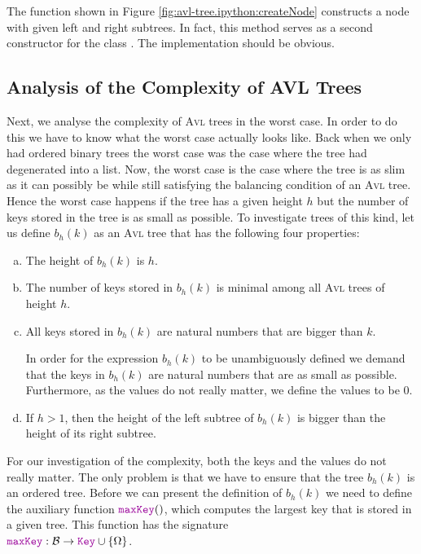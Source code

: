 The function  shown in Figure \ref{fig:avl-tree.ipython:createNode}
constructs a node with given left and right subtrees.  In fact, this method serves as a second
constructor for the class .  The implementation should be obvious.


\subsection{Analysis of the Complexity of AVL Trees}
Next, we analyse the complexity of \textsc{Avl} trees in the worst case.  In order to do this we have to know
what the worst case actually looks like.  Back when we only had ordered binary trees the worst case was the case where
the tree had degenerated into a list.  Now, the worst case is the case where the tree is as slim as
it can possibly be while still satisfying the balancing condition of an \textsc{Avl} tree.  Hence the worst case
happens if the tree has a given height $h$ but the number of keys stored in the tree is as small as
possible.  To investigate trees of this kind, let us define  $b_h(k)$ as an \textsc{Avl} tree that has the following four
properties:
\begin{enumerate}[(a)]
\item The height of $b_h(k)$ is $h$.
\item The number of keys stored in $b_h(k)$ is minimal among all \textsc{Avl} trees of height $h$.  
\item All keys stored in  $b_h(k)$ are natural numbers that are bigger than  $k$.

      In order for the expression $b_h(k)$ to be unambiguously defined we demand that the keys
      in $b_h(k)$ are natural numbers that are as small as possible.  Furthermore, as the values do
      not really matter, we define the values to be $0$.
\item If $h > 1$, then the height of the left subtree of $b_h(k)$ is bigger than the height of its right subtree.
\end{enumerate}
For our investigation of the complexity, both the keys and the values do not really matter.  The only problem
is that we have to ensure that the tree $b_h(k)$ is an ordered tree.
Before we can present the definition of $b_h(k)$ we need to define the auxiliary function
$\mytt{maxKey}()$, which computes the largest key that is stored in a given tree.  This function has the
 signature  
\\[0.2cm]
\hspace*{1.3cm}
$\mytt{maxKey}:\mathcal{B} \rightarrow \mytt{Key} \cup \{ \Omega \}$.
